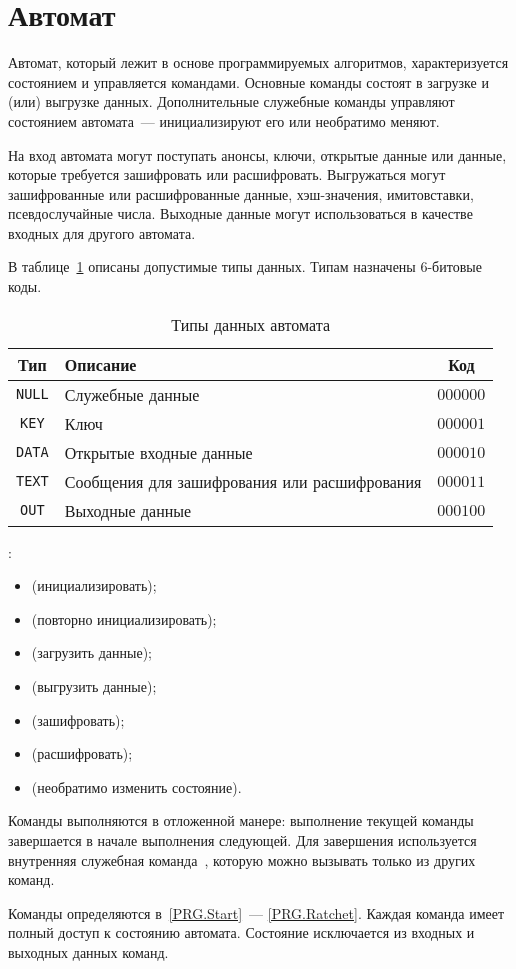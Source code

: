 \section{Автомат}\label{PRG.Auto}

Автомат, который лежит в основе программируемых алгоритмов, 
характеризуется состоянием и управляется командами.
%
Основные команды состоят в загрузке и (или) выгрузке данных.
Дополнительные служебные команды управляют состоянием автомата~---
инициализируют его или необратимо меняют.

На вход автомата могут поступать анонсы, ключи, 
открытые данные или данные, которые требуется зашифровать или расшифровать. 
%
Выгружаться могут зашифрованные или расшифрованные данные, хэш-значения, 
имитовставки, псевдослучайные числа. Выходные данные могут использоваться в 
качестве входных для другого автомата.

В таблице~\ref{Table.PRG.InOut} описаны допустимые типы данных. 
Типам назначены $6$-битовые коды.

\begin{table}[thb]
\caption{Типы данных автомата}\label{Table.PRG.InOut}
\begin{tabular}{|c|l|c|}
\hline
Тип & Описание & Код\\
\hline
\hline
\texttt{NULL} & Служебные данные & 
$000000$\\
%
\texttt{KEY} & Ключ & 
$000001$\\
%
\texttt{DATA} & Открытые входные данные & 
$000010$\\
%
\texttt{TEXT} & Сообщения для зашифрования или расшифрования & 
$000011$\\
%
\texttt{OUT} & Выходные данные & 
$000100$\\
\hline
\end{tabular}
\end{table}

:
\begin{itemize}
\item
{} (инициализировать);
\item
{} (повторно инициализировать);
\item
{} (загрузить данные);
\item
{} (выгрузить данные);
\item
{} (зашифровать);
\item
{} (расшифровать);
\item
{} (необратимо изменить состояние).
\end{itemize}

Команды выполняются в отложенной манере: выполнение текущей 
команды завершается в начале выполнения следующей.
Для завершения используется внутренняя служебная команда~, 
которую можно вызывать только из других команд.

Команды определяются в~\ref{PRG.Start}~--- \ref{PRG.Ratchet}.
%
Каждая команда имеет полный доступ к состоянию автомата.
Состояние исключается из входных и выходных данных команд.

